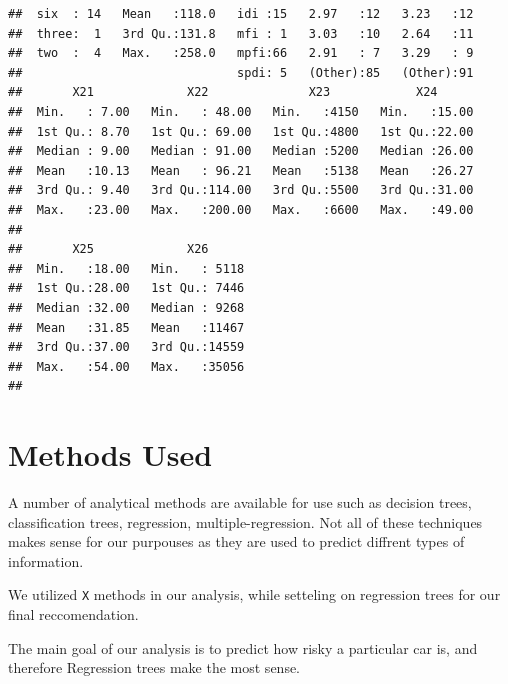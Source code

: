 \documentclass[12pt,openany]{book}
\begin{document}
\begin{verbatim}
##  six  : 14   Mean   :118.0   idi :15   2.97   :12   3.23   :12  
##  three:  1   3rd Qu.:131.8   mfi : 1   3.03   :10   2.64   :11  
##  two  :  4   Max.   :258.0   mpfi:66   2.91   : 7   3.29   : 9  
##                              spdi: 5   (Other):85   (Other):91  
##       X21             X22              X23            X24       
##  Min.   : 7.00   Min.   : 48.00   Min.   :4150   Min.   :15.00  
##  1st Qu.: 8.70   1st Qu.: 69.00   1st Qu.:4800   1st Qu.:22.00  
##  Median : 9.00   Median : 91.00   Median :5200   Median :26.00  
##  Mean   :10.13   Mean   : 96.21   Mean   :5138   Mean   :26.27  
##  3rd Qu.: 9.40   3rd Qu.:114.00   3rd Qu.:5500   3rd Qu.:31.00  
##  Max.   :23.00   Max.   :200.00   Max.   :6600   Max.   :49.00  
##                                                                 
##       X25             X26       
##  Min.   :18.00   Min.   : 5118  
##  1st Qu.:28.00   1st Qu.: 7446  
##  Median :32.00   Median : 9268  
##  Mean   :31.85   Mean   :11467  
##  3rd Qu.:37.00   3rd Qu.:14559  
##  Max.   :54.00   Max.   :35056  
## 
\end{verbatim}

\chapter{Methods Used}\label{methods-used}

A number of analytical methods are available for use such as decision
trees, classification trees, regression, multiple-regression. Not all of
these techniques makes sense for our purpouses as they are used to
predict diffrent types of information.

We utilized \texttt{X} methods in our analysis, while setteling on
regression trees for our final reccomendation.

The main goal of our analysis is to predict how risky a particular car
is, and therefore Regression trees make the most sense.
\end{document}
